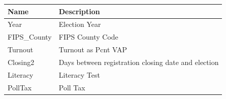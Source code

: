 \documentclass[]{book}
\begin{document}
\begin{longtable}[]{@{}ll@{}}
\toprule
\begin{minipage}[b]{0.05\columnwidth}\raggedright\strut
Name\strut
\end{minipage} & \begin{minipage}[b]{0.89\columnwidth}\raggedright\strut
Description\strut
\end{minipage}\tabularnewline
\midrule
\endhead
\begin{minipage}[t]{0.05\columnwidth}\raggedright\strut
Year\strut
\end{minipage} & \begin{minipage}[t]{0.89\columnwidth}\raggedright\strut
Election Year\strut
\end{minipage}\tabularnewline
\begin{minipage}[t]{0.05\columnwidth}\raggedright\strut
FIPS\_County\strut
\end{minipage} & \begin{minipage}[t]{0.89\columnwidth}\raggedright\strut
FIPS County Code\strut
\end{minipage}\tabularnewline
\begin{minipage}[t]{0.05\columnwidth}\raggedright\strut
Turnout\strut
\end{minipage} & \begin{minipage}[t]{0.89\columnwidth}\raggedright\strut
Turnout as Pcnt VAP\strut
\end{minipage}\tabularnewline
\begin{minipage}[t]{0.05\columnwidth}\raggedright\strut
Closing2\strut
\end{minipage} & \begin{minipage}[t]{0.89\columnwidth}\raggedright\strut
Days between registration closing date and election\strut
\end{minipage}\tabularnewline
\begin{minipage}[t]{0.05\columnwidth}\raggedright\strut
Literacy\strut
\end{minipage} & \begin{minipage}[t]{0.89\columnwidth}\raggedright\strut
Literacy Test\strut
\end{minipage}\tabularnewline
\begin{minipage}[t]{0.05\columnwidth}\raggedright\strut
PollTax\strut
\end{minipage} & \begin{minipage}[t]{0.89\columnwidth}\raggedright\strut
Poll Tax\strut
\end{minipage}\tabularnewline

\end{longtable}
\end{document}
